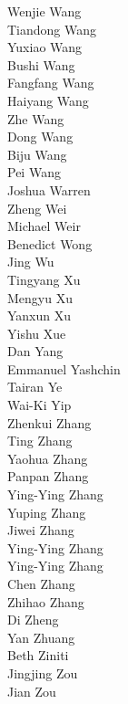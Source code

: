 Wenjie Wang\\
Tiandong Wang\\
Yuxiao Wang\\
Bushi Wang\\
Fangfang Wang\\
Haiyang Wang\\
Zhe Wang\\
Dong Wang\\
Biju Wang\\
Pei Wang\\
Joshua Warren\\
Zheng Wei\\
Michael Weir\\
Benedict Wong\\
Jing Wu\\
Tingyang Xu\\
Mengyu Xu\\
Yanxun Xu\\
Yishu Xue\\
Dan Yang\\
Emmanuel Yashchin\\
Tairan Ye\\
Wai-Ki Yip\\
Zhenkui Zhang\\
Ting Zhang\\
Yaohua  Zhang\\
Panpan Zhang\\
Ying-Ying Zhang\\
Yuping Zhang\\
Jiwei Zhang\\
Ying-Ying Zhang\\
Ying-Ying Zhang\\
Chen Zhang\\
Zhihao Zhang\\
Di Zheng\\
Yan Zhuang\\
Beth Ziniti\\
Jingjing Zou\\
Jian Zou\\
